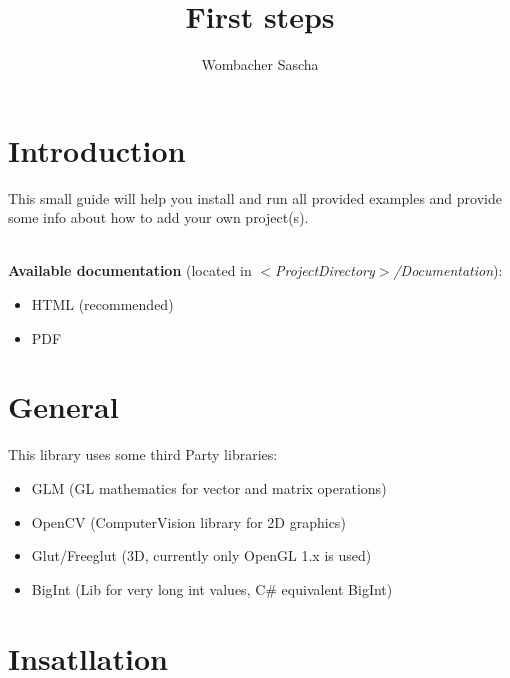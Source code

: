 \documentclass[]{article}
\title{First steps}
\author{Wombacher Sascha}
\begin{document}
\maketitle


\section{Introduction}

This small guide will help you install and run all provided examples and provide some info about how to add your own project(s).


\mbox{} \\
\textbf{Available documentation} (located in \textit{$<$ProjectDirectory$>$/Documentation}):
\begin{itemize}
\item HTML (recommended)
\item PDF
\end{itemize}

\section{General}
This library uses some third Party libraries:
\begin{itemize}
	\item GLM (GL mathematics for vector and matrix operations)
	\item OpenCV (ComputerVision library for 2D graphics)
	\item Glut/Freeglut (3D, currently only OpenGL 1.x is used)
	\item BigInt (Lib for very long int values, C\# equivalent BigInt)
\end{itemize}

\newpage
\section{Insatllation}
\end{document}
